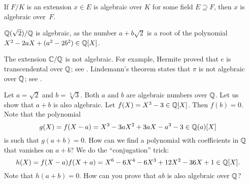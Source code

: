 If $F/K$ is an extension $x\in E$ is algebraic
over $K$ for some field $E\supseteq F$, 
then $x$ is algebraic over~$F$. 

\begin{example}
	$\mathbb{Q}(\sqrt{2})/\mathbb{Q}$ is algebraic, as the number
	$a+b\sqrt{2}$ is a root of the polynomial
	$X^2-2aX+(a^2-2b^2)\in\mathbb{Q}[X]$. 
\end{example}

The extension $\mathbb{C}/\mathbb{Q}$ is not algebraic. For example, Hermite proved 
that $e$ is transcendental 
over $\mathbb{Q}$; see \cite[Theorem 24.4]{MR3379917}. Lindemann's theorem 
states that $\pi$ is 
not algebraic over $\mathbb{Q}$; see \cite[Theorem 24.5]{MR3379917}. 

\begin{example}
\label{exa:two_algebraics}
    Let $a=\sqrt{2}$ and $b=\sqrt[3]{3}$. Both $a$ and $b$ are algebraic numbers over $\mathbb{Q}$. 
    Let us show that $a+b$ is also algebraic. Let $f(X)=X^3-3\in\mathbb{Q}[X]$. Then $f(b)=0$. Note
    that the polynomial 
    \[
    g(X)=f(X-a)=X^3-3aX^2+3aX-a^3-3\in\mathbb{Q}(a)[X]
    \]
    is such that $g(a+b)=0$. How can we find a polynomial 
    with coefficients in $\mathbb{Q}$ that vanishes on $a+b$? We do the ``conjugation'' trick:
    \[
    h(X)=f(X-a)f(X+a)=X^6-6X^4-6X^3+12X^2-36X+1\in\mathbb{Q}[X].
    \]
    Note that $h(a+b)=0$. How can you prove that $ab$ is also algebraic over $\mathbb{Q}$?     
\end{example}
